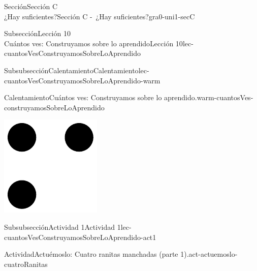\begin{sectionptx}{Sección}{{\Large Sección C\\}¿Hay suficientes?}{}{Sección C -~¿Hay suficientes?}{}{}{gra0-uni1-secC}
\begin{subsectionptx}{Subsección}{{\normalsize Lección 10\\[-0.05cm]}Cuántos ves: Construyamos sobre lo aprendido}{}{Lección 10}{}{}{lec-cuantosVesConstruyamosSobreLoAprendido}
\begin{subsubsectionptx}{Subsubsección}{Calentamiento}{}{Calentamiento}{}{}{lec-cuantosVesConstruyamosSobreLoAprendido-warm}
\begin{exploration}{Calentamiento}{Cuántos ves: Construyamos sobre lo aprendido.}{warm-cuantosVes-construyamosSobreLoAprendido}
\begin{sidebyside}{2}{0}{0}{0}
\begin{sbspanel}{0.5}
\end{sbspanel}%
\begin{sbspanel}{0.5}%
\includegraphics[max width=\linewidth, center]{external/svg-source/tikz-file-147346.pdf}
\end{sbspanel}%
\end{sidebyside}%
\end{exploration}%
\end{subsubsectionptx}
%
%
\typeout{************************************************}
\typeout{************************************************}
\clearpage
\begin{subsubsectionptx}{Subsubsección}{Actividad 1}{}{Actividad 1}{}{}{lec-cuantosVesConstruyamosSobreLoAprendido-act1}
\begin{activity}{Actividad}{Actuémoslo: Cuatro ranitas manchadas (parte 1).}{act-actuemoslo-cuatroRanitas}%
\begin{image}{0.275}{0.45}{0.275}{}%

\end{image}
\end{activity}
\end{subsubsectionptx}
\end{subsectionptx}
\end{sectionptx}
